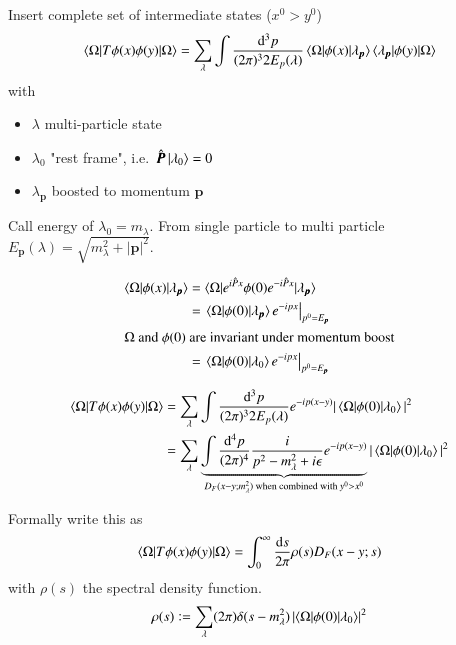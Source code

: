 Insert complete set of intermediate states ($x^0 > y^0$)
\begin{align*}
	\braket{\Omega | T\phi(x)\phi(y) | \Omega} = \sum_\lambda \int \frac{\dd^3 p}{(2\pi)^3 2E_p(\lambda)} \braket{\Omega | \phi(x) | \lambda_{\pmb{p}}} \braket{\lambda_{\pmb{p}} | \phi(y) | \Omega}
\end{align*}
with
\begin{itemize}[label={}]
	\item $\lambda$ multi-particle state
	\item $\lambda_0$ "rest frame", i.e.~$\hat{\pmb{P}}\ket{\lambda_0} = 0$
	\item $\lambda_{\pmb{p}}$ boosted to momentum $\pmb{p}$
\end{itemize}

Call energy of $\lambda_0 = m_\lambda$. From single particle to multi particle $E_{\pmb{p}}(\lambda) = \sqrt{m^2_\lambda + |\pmb{p}|^2}$.

\begin{align*}
	\braket{\Omega | \phi(x) | \lambda_{\pmb{p}}} &= \braket{\Omega| e^{i\hat{P}x} \phi(0) e^{-i\hat{P}x}|\lambda_{\pmb{p}}}	\\
									   &= \left. \braket{\Omega| \phi(0) | \lambda_{\pmb{p}}} e^{-ipx} \right\rvert_{p^0 = E_{\pmb{p}}} \\
									   \shortintertext{$\Omega$ and $\phi(0)$ are invariant under momentum boost}
									   &= \left. \braket{\Omega| \phi(0) | \lambda_{0}} e^{-ipx} \right\rvert_{p^0 = E_{\pmb{p}}} \\
\end{align*}

\begin{align}
	\braket{\Omega | T\phi(x)\phi(y) | \Omega} &= \sum_\lambda \int \frac{\dd^3 p}{(2\pi)^3 2E_p(\lambda)} e^{-ip(x-y)} |\braket{\Omega| \phi(0) | \lambda_0 }|^2 \\
											   &= \sum_\lambda \underbrace{\int \frac{\dd^4 p}{(2\pi)^4} \frac{i}{p^2 - m^2_\lambda + i\epsilon} e^{-ip(x-y)}}_{D_F(x-y;m^2_\lambda) \text{ when combined with } y^0 > x^0} |\braket{\Omega| \phi(0) | \lambda_0 }|^2 \\ 
\end{align}

Formally write this as 
\begin{align}
	\braket{\Omega | T\phi(x)\phi(y) | \Omega} = \int^\infty_0 \frac{\dd s}{2\pi} \rho(s) D_F(x-y;s)
\end{align}
with $\rho(s)$ the spectral density function.
\begin{align}
	\rho(s) \vcentcolon = \sum_\lambda (2\pi) \delta(s - m_\lambda^2) \left| \braket{\Omega | \phi(0) | \lambda_0} \right|^2
\end{align}


